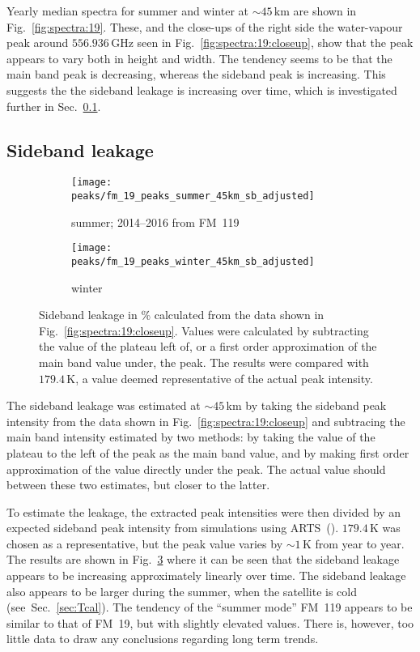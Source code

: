 \noindent
Yearly median spectra for summer and winter at $\sim45\,\mathrm{km}$ are shown
in Fig.~\ref{fig:spectra:19}.  These, and the close-ups of the right side the
water-vapour peak around $556.936\,\mathrm{GHz}$ seen in
Fig.~\ref{fig:spectra:19:closeup}, show that the peak appears to vary both in
height and width.  The tendency seems to be that the main band peak is
decreasing, whereas the sideband peak is increasing.  This suggests the the
sideband leakage is increasing over time, which is investigated further in
Sec.~\ref{FM19:sbl}.


\subsection{Sideband leakage}
\label{FM19:sbl}

\begin{figure}[ht]
    \centering
    \begin{subfigure}[b]{0.9545\textwidth}
        \texttt{[image: peaks/fm\_19\_peaks\_summer\_45km\_sb\_adjusted]}
        \caption{summer; 2014--2016 from FM~119
            }\label{fig:sbl:19:summer}
    \end{subfigure}
    \begin{subfigure}[b]{0.9545\textwidth}
        \texttt{[image: peaks/fm\_19\_peaks\_winter\_45km\_sb\_adjusted]}
        \caption{winter}\label{fig:sbl:19:winter}
    \end{subfigure}
    \caption{Sideband leakage in \% calculated from the data shown in
        Fig.~\ref{fig:spectra:19:closeup}.  Values were calculated by
        subtracting the value of the plateau left of, or a first order
        approximation of the main band value under, the peak.  The results were
        compared with $179.4\,\mathrm{K}$, a value deemed representative of the
        actual peak intensity.
        }\label{fig:sbl:19}
\end{figure}

\noindent
The sideband leakage was estimated at $\sim45\,\mathrm{km}$ by taking the
sideband peak intensity from the data shown in
Fig.~\ref{fig:spectra:19:closeup} and subtracing the main band intensity
estimated by two methods:  by taking the value of the plateau to the left of
the peak as the main band value, and by making first order approximation of the
value directly under the peak.  The actual value should between these two
estimates, but closer to the latter.

To estimate the leakage, the extracted peak intensities were then divided by an
expected sideband peak intensity from simulations using
ARTS~(\cite{buehler:artst:05}).  $179.4\,\mathrm{K}$ was chosen as a
representative, but the peak value varies by $\sim1\,\mathrm{K}$ from year to
year.  The results are shown in Fig.~\ref{fig:sbl:19} where it can be seen that
the sideband leakage appears to be increasing approximately linearly over time.
The sideband leakage also appears to be larger during the summer, when the
satellite is cold (see~Sec.~\ref{sec:Tcal}).  The tendency of the ``summer
mode'' FM~119 appears to be similar to that of FM~19, but with slightly
elevated values.  There is, however, too little data to draw any conclusions
regarding long term trends.


